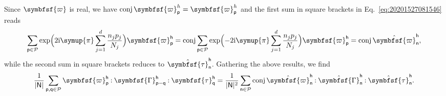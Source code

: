 \documentclass[draft, appendixprefix=true, chapterprefix=true, fontsize=12pt, numbers=noendperiod]{scrbook}
\newcommand{\cellindices}{\mathcal P}
\DeclareMathOperator{\conj}{conj}
\newcommand{\dbldot}{\mathbin{\mathord{:}}}
\newcommand{\I}{\mathrm{i}}
\newcommand{\tens}[1]{\symbfsf{#1}}
\newcommand{\PI}{\symup{\pi}}
\newcommand{\tuple}[1]{\mathsf{#1}}
\begin{document}
Since \(\tens\varpi\) is real, we have
\(\conj\tens\varpi_{\tuple p}^h=\tens\varpi_{\tuple p}^h\) and the first sum in
square brackets in Eq.~\eqref{eq:20201527081546} reads
\begin{equation}
  \sum_{\tuple{p}\in\cellindices}\exp\Bigl(2\I\PI\sum_{j=1}^d\frac{n_jp_j}{N_j}\Bigr)
  \tens\varpi_{\tuple p}^{\tuple h}=\conj\sum_{\tuple{p}\in\cellindices}\exp
  \Bigl(-2\I\PI\sum_{j=1}^d\frac{n_jp_j}{N_j}\Bigr)\tens\varpi_{\tuple p}^{\tuple h}
  =\conj\hat{\tens\varpi}_{\tuple n}^{\tuple h},
\end{equation}
while the second sum in square brackets reduces to
\(\hat{\tens\tau}_{\tuple n}^{\tuple h}\). Gathering the above results, we find
\begin{equation}
  \frac{1}{\lvert\tuple N\rvert}\sum_{\tuple p, \tuple q\in\cellindices}
  \tens\varpi_{\tuple p}^{\tuple h}\dbldot\tens\Gamma_{\tuple p-\tuple q}^{\tuple h}
  \dbldot\tens\tau_{\tuple q}^{\tuple h}=\frac1{\lvert\tuple N\rvert^2}
  \sum_{\tuple n\in\cellindices}\conj\hat{\tens\varpi}_{\tuple n}^{\tuple h}
  \dbldot\hat{\tens\Gamma}_{\tuple n}^{\tuple h}\dbldot
  \hat{\tens\tau}_{\tuple n}^{\tuple h}.
\end{equation}
\end{document}
